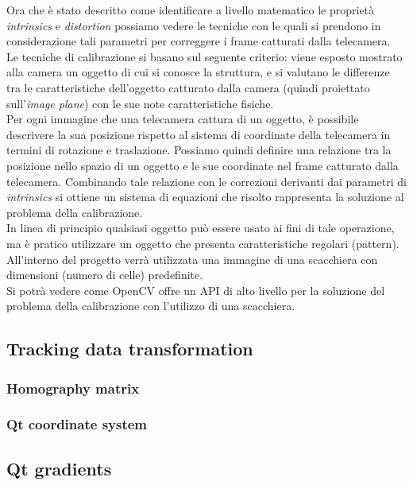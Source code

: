 Ora che è stato descritto come identificare a livello matematico le proprietà \textit{intrinsics} e \textit{distortion} possiamo vedere le tecniche con le quali si prendono in considerazione tali parametri per correggere i frame catturati dalla telecamera.\\
Le tecniche di calibrazione si basano sul seguente criterio: viene esposto mostrato alla camera un oggetto di cui si conosce la struttura, e si valutano le differenze tra le caratteristiche dell'oggetto catturato dalla camera (quindi proiettato sull'\textit{image plane}) con le sue note caratteristiche fisiche. \\Per ogni immagine che una telecamera cattura di un oggetto, è possibile descrivere la sua posizione rispetto al sistema di coordinate della telecamera in termini di rotazione e traslazione. Possiamo quindi definire una relazione tra la posizione nello spazio di un oggetto e le sue coordinate nel frame catturato dalla telecamera. Combinando tale relazione con le correzioni derivanti dai parametri di \textit{intrinsics} si ottiene un sistema di equazioni che risolto rappresenta la soluzione al problema della calibrazione.\\
In linea di principio qualsiasi oggetto può essere usato ai fini di tale operazione, ma è pratico utilizzare un oggetto che presenta caratteristiche regolari (pattern). All'interno del progetto verrà utilizzata una immagine di una scacchiera con dimensioni (numero di celle) predefinite.  \\
Si potrà vedere come OpenCV offre un API di alto livello per la soluzione del problema della calibrazione con l'utilizzo di una scacchiera.

\subsection{Tracking data transformation}

\subsubsection{Homography matrix}

\subsubsection{Qt coordinate system}


\subsection{Qt gradients}
